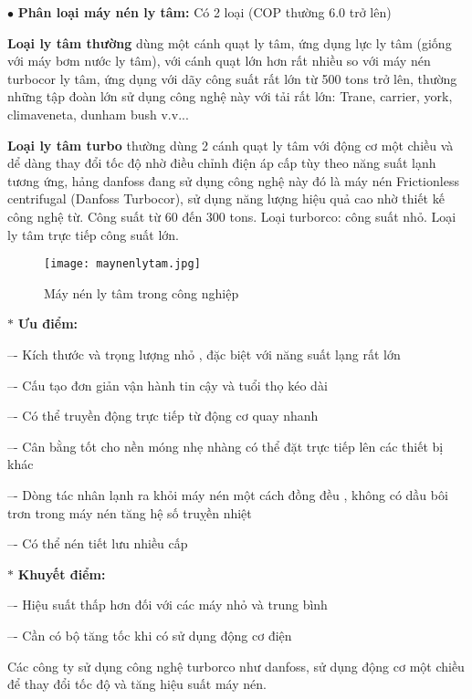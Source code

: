 \begin{enumerate}
		$ \bullet $ \textbf{Phân loại máy nén ly tâm:} Có 2 loại (COP thường 6.0 trở lên)
		
		\textbf{Loại ly tâm thường} dùng một cánh quạt ly tâm, ứng dụng lực ly tâm (giống với máy bơm nước ly tâm), với cánh quạt lớn hơn rất nhiều so với máy nén turbocor ly tâm, ứng dụng với dãy công suất rất lớn từ 500 tons trở lên, thường những tập đoàn lớn sử dụng công nghệ này với tải rất lớn: Trane, carrier, york, climaveneta, dunham bush v.v...
		
		\textbf{Loại ly tâm turbo} thường dùng 2 cánh quạt ly tâm với động cơ một chiều và dể dàng thay đổi tốc độ nhờ điều chỉnh điện áp cấp tùy theo năng suất lạnh tương ứng, hảng danfoss đang sử dụng công nghệ này đó là máy nén Frictionless centrifugal (Danfoss Turbocor), sử dụng năng lượng hiệu quả cao nhờ thiết kế công nghệ từ. Công suất từ 60 đến 300 tons. Loại turborco: công suất nhỏ. Loại ly tâm trực tiếp công suất lớn.

\begin{figure}[H]
	\centering
	\texttt{[image: maynenlytam.jpg]}
	\caption{Máy nén ly tâm trong công nghiệp}
\end{figure}			
		
		$ \ast $ \textbf{Ưu điểm:} 
		
		–- Kích thước và trọng lượng nhỏ , đặc biệt với năng suất lạng rất lớn
		
		–- Cấu tạo đơn giản vận hành tin cậy và tuổi thọ kéo dài
		
		–- Có thể truyền động trực tiếp từ động cơ quay nhanh
		
		–- Cân bằng tốt cho nền móng nhẹ nhàng có thể đặt trực tiếp lên các thiết bị khác
		
		–- Dòng tác nhân lạnh ra khỏi máy nén một cách đồng đều , không có dầu bôi trơn trong máy nén tăng hệ số truỵền nhiệt
		
		–- Có thể nén tiết lưu nhiều cấp 
		
		$ \ast $ \textbf{Khuyết điểm:} 
		
		–- Hiệu suất thấp hơn đối với các máy nhỏ và trung bình
		
		–- Cần có bộ tăng tốc khi có sử dụng động cơ điện
		
		Các công ty sử dụng công nghệ turborco như danfoss, sử dụng động cơ một chiều để thay đổi tốc độ và tăng hiệu suất máy nén.
		
	\end{enumerate}
	
